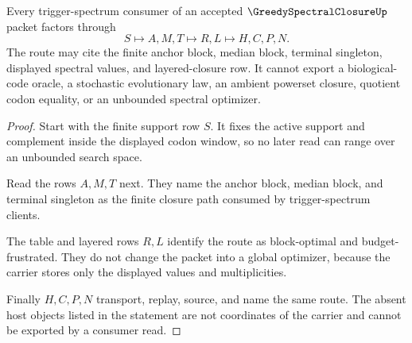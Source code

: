\begin{theorem}
\label{thm:greedy-spectral-closure-trigger-nonescape}
Every trigger-spectrum consumer of an accepted $\GreedySpectralClosureUp$ packet factors through
$$
S\longmapsto A,M,T\longmapsto R,L\longmapsto H,C,P,N.
$$
The route may cite the finite anchor block, median block, terminal singleton, displayed spectral values, and layered-closure row. It cannot export a biological-code oracle, a stochastic evolutionary law, an ambient powerset closure, quotient codon equality, or an unbounded spectral optimizer.
\end{theorem}
\begin{proof}
Start with the finite support row $S$. It fixes the active support and complement inside the displayed codon window, so no later read can range over an unbounded search space.

Read the rows $A,M,T$ next. They name the anchor block, median block, and terminal singleton as the finite closure path consumed by trigger-spectrum clients.

The table and layered rows $R,L$ identify the route as block-optimal and budget-frustrated. They do not change the packet into a global optimizer, because the carrier stores only the displayed values and multiplicities.

Finally $H,C,P,N$ transport, replay, source, and name the same route. The absent host objects listed in the statement are not coordinates of the carrier and cannot be exported by a consumer read.
\end{proof}

